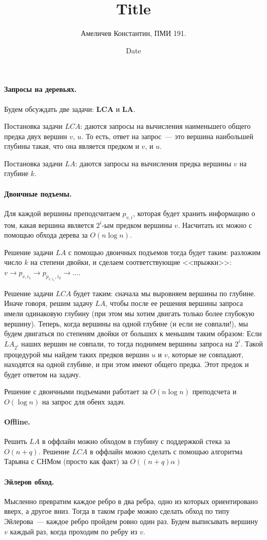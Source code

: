\documentclass[12pt]{article}
\title{Title}
\author{Амеличев Константин, ПМИ 191.}
\date{Date}
\begin{document}
\paragraph{Запросы на деревьях.} Будем обсуждать две задачи: \textbf{LCA} и \textbf{LA}. 

Постановка задачи $LCA$: даются запросы на вычисления наименьшего общего предка двух вершин $v,\,u$. То есть, ответ на запрос~--- это вершина наибольшей глубины такая, что она является предком и $v$, и $u$.

Постановка задачи $LA$: даются запросы на вычисления предка вершины $v$ на глубине $k$.

\paragraph{Двоичные подъемы.} Для каждой вершины преподсчитаем $p_{v,i}$, которая будет хранить информацию о том, какая вершина является $2^i$-ым предком вершины $v$. Насчитать их можно с помощью обхода дерева за $O(n \log n)$.

Решение задачи $LA$ с помощью двоичных подъемов тогда будет таким: разложим число $k$ на степени двойки, и сделаем соответствующие <<прыжки>>: $v \rightarrow p_{v,i_1} \rightarrow p_{p_{v,i_1}, i_2} \rightarrow \ldots$.

Решение задачи $LCA$ будет таким: сначала мы выровняем вершины по глубине. Иначе говоря, решим задачу $LA$, чтобы после ее решения вершины запроса имели одинаковую глубину (при этом мы хотим двигать только более глубокую вершину). Теперь, когда вершины на одной глубине (и если не совпали!), мы будем двигаться по степеням двойки от больших к меньшим таким образом: Если $LA_{2^i}$ наших вершин не совпали, то тогда поднимем вершины запроса на $2^i$. Такой процедурой мы найдем таких предков вершин $u$ и $v$, которые не совпадают, находятся на одной глубине, и при этом имеют общего предка. Этот предок и будет ответом на задачу.

Решение с двоичными подъемами работает за $O(n \log n)$ преподсчета и $O(\log n)$ на запрос для обеих задач.

\paragraph{Offline.} Решить $LA$ в оффлайн можно обходом в глубину с поддержкой стека за $O(n + q)$. Решение $LCA$ в оффлайн можно сделать с помощью алгоритма Тарьяна с СНМом (просто как факт) за $O((n + q) \alpha)$

\paragraph{Эйлеров обход.} Мысленно превратим каждое ребро в два ребра, одно из которых ориентировано вверх, а другое вниз. Тогда в таком графе можно сделать обход по типу Эйлерова~--- каждое ребро пройдем ровно один раз. Будем выписывать вершину $v$ каждый раз, когда проходим по ребру из $v$.
\end{document}
